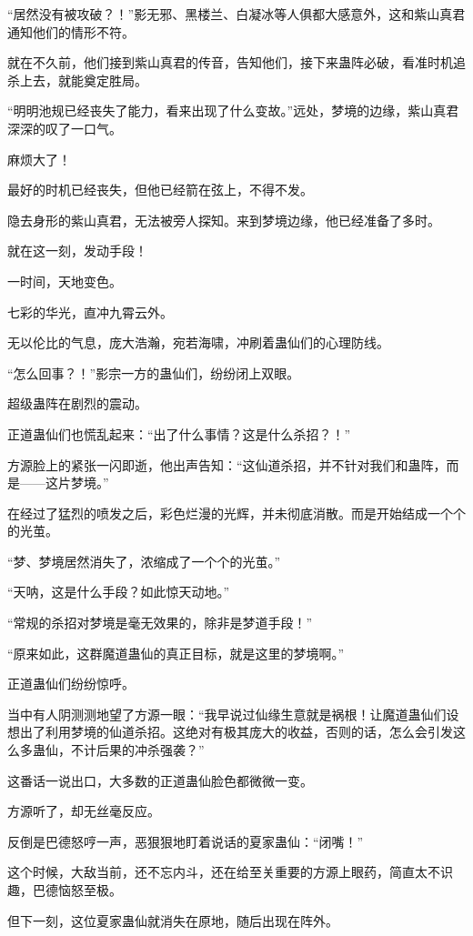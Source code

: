 \begin{this_body}
“居然没有被攻破？！”影无邪、黑楼兰、白凝冰等人俱都大感意外，这和紫山真君通知他们的情形不符。

就在不久前，他们接到紫山真君的传音，告知他们，接下来蛊阵必破，看准时机追杀上去，就能奠定胜局。

“明明池规已经丧失了能力，看来出现了什么变故。”远处，梦境的边缘，紫山真君深深的叹了一口气。

麻烦大了！

最好的时机已经丧失，但他已经箭在弦上，不得不发。

隐去身形的紫山真君，无法被旁人探知。来到梦境边缘，他已经准备了多时。

就在这一刻，发动手段！

一时间，天地变色。

七彩的华光，直冲九霄云外。

无以伦比的气息，庞大浩瀚，宛若海啸，冲刷着蛊仙们的心理防线。

“怎么回事？！”影宗一方的蛊仙们，纷纷闭上双眼。

超级蛊阵在剧烈的震动。

正道蛊仙们也慌乱起来：“出了什么事情？这是什么杀招？！”

方源脸上的紧张一闪即逝，他出声告知：“这仙道杀招，并不针对我们和蛊阵，而是——这片梦境。”

在经过了猛烈的喷发之后，彩色烂漫的光辉，并未彻底消散。而是开始结成一个个的光茧。

“梦、梦境居然消失了，浓缩成了一个个的光茧。”

“天呐，这是什么手段？如此惊天动地。”

“常规的杀招对梦境是毫无效果的，除非是梦道手段！”

“原来如此，这群魔道蛊仙的真正目标，就是这里的梦境啊。”

正道蛊仙们纷纷惊呼。

当中有人阴测测地望了方源一眼：“我早说过仙缘生意就是祸根！让魔道蛊仙们设想出了利用梦境的仙道杀招。这绝对有极其庞大的收益，否则的话，怎么会引发这么多蛊仙，不计后果的冲杀强袭？”

这番话一说出口，大多数的正道蛊仙脸色都微微一变。

方源听了，却无丝毫反应。

反倒是巴德怒哼一声，恶狠狠地盯着说话的夏家蛊仙：“闭嘴！”

这个时候，大敌当前，还不忘内斗，还在给至关重要的方源上眼药，简直太不识趣，巴德恼怒至极。

但下一刻，这位夏家蛊仙就消失在原地，随后出现在阵外。


\end{this_body}

